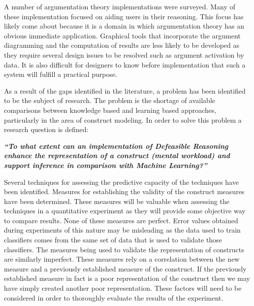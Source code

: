 A number of argumentation theory implementations were surveyed. Many of these implementation focused on aiding users in their reasoning. This focus has likely come about because it is a domain in which argumentation theory has an obvious immediate application. Graphical tools that incorporate the argument diagramming and the computation of results are less likely to be developed as they require several design issues to be resolved such as argument activation by data. It is also difficult for designers to know before implementation that such a system will fulfill a practical purpose.


As a result of the gaps identified in the literature, a problem has been identified to be the subject of research. The problem is the shortage of available comparisons between knowledge based and learning based approaches, particularly in the area of construct modeling. In order to solve this problem a research question is defined:

\textit{\textbf{``To what extent can an implementation of Defeasible Reasoning enhance the representation of a construct (mental workload) and support inference in comparison with Machine Learning?''}}

Several techniques for assessing the predictive capacity of the techniques have been identified. Measures for establishing the validity of the construct measures have been determined. These measures will be valuable when assessing the techniques in a quantitative experiment as they will provide some objective way to compare results. None of these measures are perfect. Error values obtained during experiments of this nature may be misleading as the data used to train classifiers comes from the same set of data that is used to validate those classifiers. The measures being used to validate the representation of constructs are similarly imperfect. These measures rely on a correlation between the new measure and a previously established measure of the construct. If the previously established measure in fact is a poor representation of the construct then we may have simply created another poor representation. These factors will need to be considered in order to thoroughly evaluate the results of the experiment.
